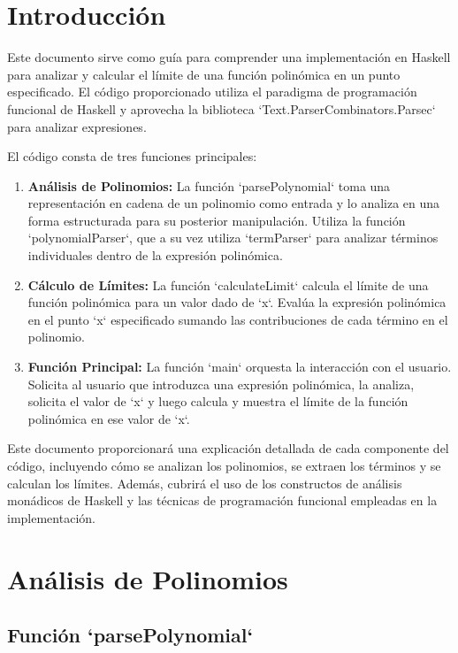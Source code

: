 \documentclass{article}
\begin{document}
\section{Introducción}

Este documento sirve como guía para comprender una implementación en Haskell para analizar y calcular el límite de una función polinómica en un punto especificado. El código proporcionado utiliza el paradigma de programación funcional de Haskell y aprovecha la biblioteca `Text.ParserCombinators.Parsec` para analizar expresiones.

El código consta de tres funciones principales:

\begin{enumerate}
  \item \textbf{Análisis de Polinomios:} La función `parsePolynomial` toma una representación en cadena de un polinomio como entrada y lo analiza en una forma estructurada para su posterior manipulación. Utiliza la función `polynomialParser`, que a su vez utiliza `termParser` para analizar términos individuales dentro de la expresión polinómica.

  \item \textbf{Cálculo de Límites:} La función `calculateLimit` calcula el límite de una función polinómica para un valor dado de `x`. Evalúa la expresión polinómica en el punto `x` especificado sumando las contribuciones de cada término en el polinomio.

  \item \textbf{Función Principal:} La función `main` orquesta la interacción con el usuario. Solicita al usuario que introduzca una expresión polinómica, la analiza, solicita el valor de `x` y luego calcula y muestra el límite de la función polinómica en ese valor de `x`.
\end{enumerate}

Este documento proporcionará una explicación detallada de cada componente del código, incluyendo cómo se analizan los polinomios, se extraen los términos y se calculan los límites. Además, cubrirá el uso de los constructos de análisis monádicos de Haskell y las técnicas de programación funcional empleadas en la implementación.

\section{Análisis de Polinomios}

\subsection{Función `parsePolynomial`}
\end{document}
